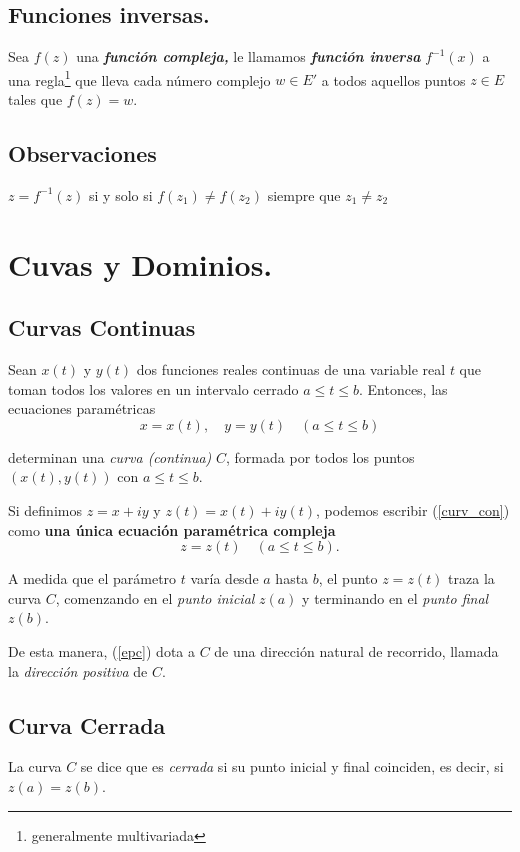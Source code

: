 \documentclass[10pt,a4paper]{book}
\begin{document}
\subsection{Funciones inversas.}
Sea $f(z)$ una \textbf{\textit{función compleja,}} le llamamos \textbf{\textit{función inversa}} $f^{-1}(x)$ a una regla\footnote{generalmente multivariada} que lleva cada número complejo $w\in E'$ a todos aquellos puntos $z\in E$ tales que $f(z)=w$. 

\subsection*{Observaciones}
$z=f^{-1}(z)$ si y solo si $f(z_1)\neq f(z_2)$ siempre que $z_1\neq z_2$

\section{Cuvas y Dominios.}
\subsection{Curvas Continuas}
Sean \( x(t) \) y \( y(t) \) dos funciones reales continuas de una variable real \( t \) que toman todos los valores en un intervalo cerrado \( a \leq t \leq b \). Entonces, las ecuaciones paramétricas
\begin{equation}
	x = x(t), \quad y = y(t) \quad (a \leq t \leq b)  \label{curv_con}
\end{equation}

determinan una \textit{curva (continua)} \( C \), formada por todos los puntos \( (x(t), y(t)) \) con \( a \leq t \leq b \).

Si definimos \( z = x + iy \) y \( z(t) = x(t) + iy(t) \), podemos escribir (\ref{curv_con}) como \textbf{una única ecuación paramétrica compleja}
\begin{equation} 
	z = z(t) \quad (a \leq t \leq b). \label{epc}
\end{equation}

A medida que el parámetro \( t \) varía desde \( a \) hasta \( b \), el punto \( z = z(t) \) traza la curva \( C \), comenzando en el \textit{punto inicial} \( z(a) \) y terminando en el \textit{punto final} \( z(b) \).

De esta manera, (\ref{epc}) dota a \( C \) de una dirección natural de recorrido, llamada la \textit{dirección positiva} de \( C \). 

\subsection{Curva Cerrada} 
La curva \( C \) se dice que es \textit{cerrada} si su punto inicial y final coinciden, es decir, si \( z(a) = z(b) \).
\end{document}
